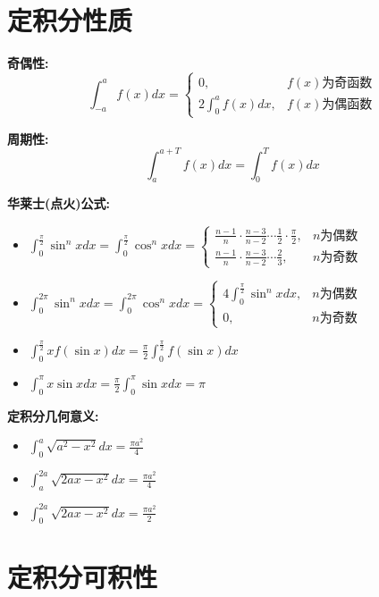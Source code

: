 \documentclass[10pt]{article}
\begin{document}
\begin{multicols*}{2}
\section*{定积分性质}
\vspace{-8pt}

\textbf{奇偶性:}
\[\int_{-a}^a f(x)dx = \begin{cases} 
0, & f(x) \text{为奇函数} \\
2\int_0^a f(x)dx, & f(x) \text{为偶函数}
\end{cases}\]

\textbf{周期性:}
\[\int_a^{a+T} f(x)dx = \int_0^T f(x)dx\]

\textbf{华莱士(点火)公式:}
\begin{itemize}
  \item \(\int_0^{\frac{\pi}{2}} \sin^n x dx = \int_0^{\frac{\pi}{2}} \cos^n x dx = \begin{cases} 
  \frac{n-1}{n} \cdot \frac{n-3}{n-2} \cdots \frac{1}{2} \cdot \frac{\pi}{2}, & n \text{为偶数} \\
  \frac{n-1}{n} \cdot \frac{n-3}{n-2} \cdots \frac{2}{3}, & n \text{为奇数}
  \end{cases}\)
  \item \(\int_0^{2\pi} \sin^n x dx = \int_0^{2\pi} \cos^n x dx = \begin{cases} 
  4\int_0^{\frac{\pi}{2}} \sin^n x dx, & n \text{为偶数} \\
  0, & n \text{为奇数}
  \end{cases}\)
  \item \(\int_0^{\frac{\pi}{2}} x f(\sin x)dx = \frac{\pi}{2}\int_0^{\frac{\pi}{2}} f(\sin x)dx\)
  \item \(\int_0^{\pi} x \sin x dx = \frac{\pi}{2}\int_0^{\pi} \sin x dx = \pi\)
\end{itemize}

\textbf{定积分几何意义:}
\begin{itemize}
  \item \(\int_0^a \sqrt{a^2 - x^2}dx = \frac{\pi a^2}{4}\)
  \item \(\int_a^{2a} \sqrt{2ax - x^2}dx = \frac{\pi a^2}{4}\)
  \item \(\int_0^{2a} \sqrt{2ax - x^2}dx = \frac{\pi a^2}{2}\)
\end{itemize}

\section*{定积分可积性}
\vspace{-8pt}


\end{multicols*}
\end{document}
